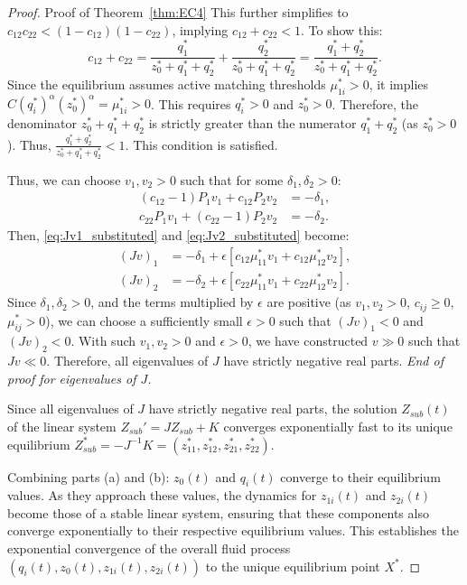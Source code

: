 \begin{proof}{Proof of Theorem~\ref{thm:EC4}}
This further simplifies to $c_{12}c_{22} < (1-c_{12})(1-c_{22})$, implying $c_{12} + c_{22} < 1$.
To show this:
\begin{equation*}
  c_{12} + c_{22} = \frac{q_1^*}{z_0^*+q_1^*+q_2^*} + \frac{q_2^*}{z_0^*+q_1^*+q_2^*} = \frac{q_1^*+q_2^*}{z_0^*+q_1^*+q_2^*}.
\end{equation*}
Since the equilibrium assumes active matching thresholds $\mu_{1i}^* > 0$, it implies $C (q_i^*)^{\alpha} (z_0^*)^{\alpha} = \mu_{1i}^* > 0$. This requires $q_i^* > 0$ and $z_0^* > 0$.
Therefore, the denominator $z_0^*+q_1^*+q_2^*$ is strictly greater than the numerator $q_1^*+q_2^*$ (as $z_0^* > 0$).
Thus, $\frac{q_1^*+q_2^*}{z_0^*+q_1^*+q_2^*} < 1$. This condition is satisfied.

Thus, we can choose $v_1, v_2 > 0$ such that for some $\delta_1, \delta_2 > 0$:
\begin{align*}
(c_{12}-1)P_1 v_1 + c_{12}P_2 v_2 &= -\delta_1, \\
c_{22}P_1 v_1 + (c_{22}-1)P_2 v_2 &= -\delta_2.
\end{align*}
Then, \eqref{eq:Jv1_substituted} and \eqref{eq:Jv2_substituted} become:
\begin{align*}
(Jv)_1 &= -\delta_1 + \epsilon [c_{12}\mu_{11}^{*}v_1 + c_{12}\mu_{12}^{*}v_2], \\
(Jv)_2 &= -\delta_2 + \epsilon [c_{22}\mu_{11}^{*}v_1 + c_{22}\mu_{12}^{*}v_2].
\end{align*}
Since $\delta_1, \delta_2 > 0$, and the terms multiplied by $\epsilon$ are positive (as $v_1,v_2>0$, $c_{ij} \ge 0$, $\mu_{ij}^* >0$), we can choose a sufficiently small $\epsilon > 0$ such that $(Jv)_1 < 0$ and $(Jv)_2 < 0$.
With such $v_1, v_2 > 0$ and $\epsilon > 0$, we have constructed $v \gg 0$ such that $Jv \ll 0$.
Therefore, all eigenvalues of $J$ have strictly negative real parts.
\textit{End of proof for eigenvalues of $J$.}

Since all eigenvalues of $J$ have strictly negative real parts, the solution $Z_{sub}(t)$ of the linear system $Z_{sub}' = J Z_{sub} + K$ converges exponentially fast to its unique equilibrium $Z_{sub}^* = -J^{-1}K = (z_{11}^*, z_{12}^*, z_{21}^*, z_{22}^*)$.

Combining parts (a) and (b): $z_0(t)$ and $q_i(t)$ converge to their equilibrium values. As they approach these values, the dynamics for $z_{1i}(t)$ and $z_{2i}(t)$ become those of a stable linear system, ensuring that these components also converge exponentially to their respective equilibrium values. This establishes the exponential convergence of the overall fluid process $(q_i(t), z_0(t), z_{1i}(t), z_{2i}(t))$ to the unique equilibrium point $X^*$.
\Halmos
\end{proof}

